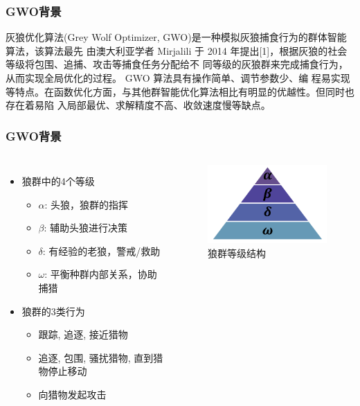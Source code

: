 \begin{frame}
	\frametitle{GWO背景}
	灰狼优化算法(Grey Wolf Optimizer, GWO)是一种模拟灰狼捕食行为的群体智能算法，该算法最先
	由澳大利亚学者 Mirjalili 于 2014 年提出[1]，根据灰狼的社会等级将包围、追捕、攻击等捕食任务分配给不
	同等级的灰狼群来完成捕食行为，从而实现全局优化的过程。 GWO 算法具有操作简单、调节参数少、编
	程易实现等特点。在函数优化方面，与其他群智能优化算法相比有明显的优越性。但同时也存在着易陷
	入局部最优、求解精度不高、收敛速度慢等缺点。
\end{frame}


\begin{frame}
	\frametitle{GWO背景}
	\begin{columns}
		\begin{itemize}
			\item {狼群中的4个等级}
				\begin{itemize}
					\item {$\alpha$: 头狼，狼群的指挥}
					\item {$\beta$: 辅助头狼进行决策}
					\item {$\delta$: 有经验的老狼，警戒/救助}
					\item {$\omega$: 平衡种群内部关系，协助捕猎}
				\end{itemize}
			\item {狼群的3类行为}
				\begin{itemize}
					\item {跟踪, 追逐, 接近猎物}
					\item {追逐, 包围, 骚扰猎物, 直到猎物停止移动}
					\item {向猎物发起攻击}
				\end{itemize}
		\end{itemize}
		\begin{figure}[htbp]
			\centering
			\includegraphics[width=6cm]{pic/wolf1.png}
			\caption{狼群等级结构}
		\end{figure}
	\end{columns}
\end{frame}


